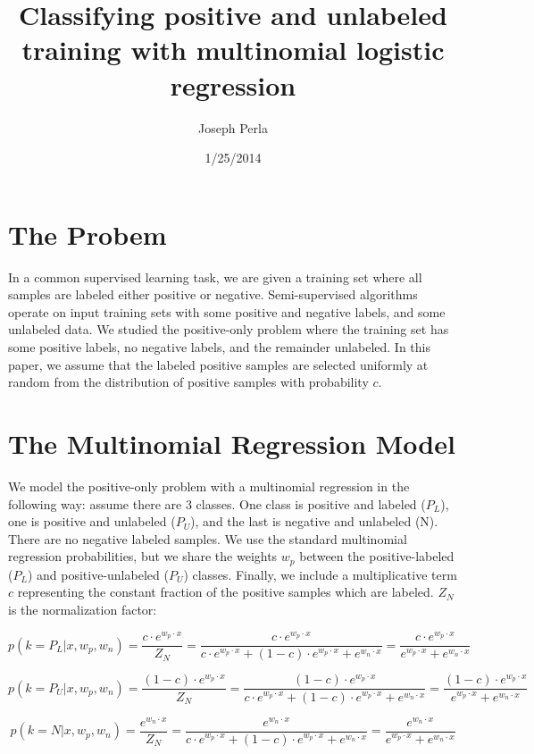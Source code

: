 \documentclass[]{article}
\begin{document}
\title{Classifying positive and unlabeled training  with multinomial logistic regression}
\author{Joseph Perla}
\date{1/25/2014}
\maketitle

\section{The Probem}
In a common supervised learning task, we are given a training set where all samples are labeled either positive or negative. Semi-supervised algorithms operate on input training sets with some positive and negative labels, and some unlabeled data.  We studied the positive-only problem where the training set has some positive labels, no negative labels, and the remainder unlabeled.  In this paper, we assume that the labeled positive samples are selected uniformly at random from the distribution of positive samples with probability $c$.

\section{The Multinomial Regression Model}

We model the positive-only problem with a multinomial regression in the following way: assume there are 3 classes.  One class is positive and labeled ($P_L$), one is positive and unlabeled ($P_U$), and the last is negative and unlabeled (N).  There are no negative labeled samples.  We use the standard multinomial regression probabilities, but we share the weights $w_p$ between the positive-labeled ($P_L$) and positive-unlabeled ($P_U$) classes. Finally, we include a multiplicative term $c$ representing the constant fraction of the positive samples which are labeled.  $Z_N$ is the normalization factor:

$$
p(k=P_L | x, w_p, w_n) =  \frac{c \cdot e^{w_p \cdot x}}{Z_N} = \frac{c \cdot e^{w_p \cdot x}}{c \cdot e^{w_p \cdot x} + (1 - c) \cdot e^{w_p \cdot x} + e^{w_n \cdot x}} = \frac{c \cdot e^{w_p \cdot x}}{e^{w_p \cdot x} + e^{w_n \cdot x}}
$$

$$
p(k=P_U | x, w_p, w_n) =  \frac{(1 - c) \cdot e^{w_p \cdot x}}{Z_N} = \frac{(1 - c) \cdot e^{w_p \cdot x}}{c \cdot e^{w_p \cdot x} + (1 - c) \cdot e^{w_p \cdot x} + e^{w_n \cdot x}} = \frac{(1 - c) \cdot e^{w_p \cdot x}}{e^{w_p \cdot x} + e^{w_n \cdot x}}
$$

$$
p(k=N | x, w_p, w_n) =  \frac{e^{w_n \cdot x}}{Z_N} = \frac{e^{w_n \cdot x}}{c \cdot e^{w_p \cdot x} + (1 - c) \cdot e^{w_p \cdot x} + e^{w_n \cdot x}} = \frac{e^{w_n \cdot x}}{e^{w_p \cdot x} + e^{w_n \cdot x}}
$$
\end{document}
